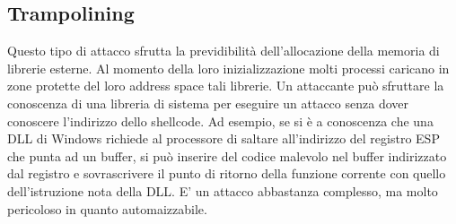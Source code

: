 \subsection{Trampolining}
Questo tipo di attacco sfrutta la previdibilità dell'allocazione della memoria di librerie esterne. Al momento della loro inizializzazione molti processi caricano in zone protette del loro address space tali librerie. Un attaccante può sfruttare la conoscenza di una libreria di sistema per eseguire un attacco senza dover conoscere l'indirizzo dello shellcode. Ad esempio, se si è a conoscenza che una DLL di Windows richiede al processore di saltare all'indirizzo del registro ESP che punta ad un buffer, si può inserire del codice malevolo nel buffer indirizzato dal registro e sovrascrivere il punto di ritorno della funzione corrente con quello dell'istruzione nota della DLL. E' un attacco abbastanza complesso, ma molto pericoloso in quanto automaizzabile.
